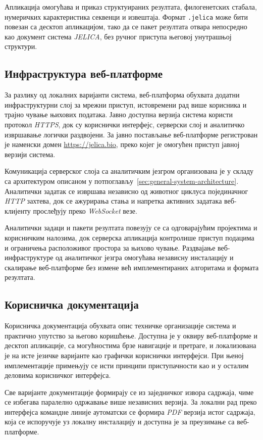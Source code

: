 \documentclass[12pt,oneside]{memoir}
\begin{document}
Апликација омогућава и приказ структуираних резултата, филогенетских стабала, нумеричких карактеристика секвенци и извештаја. Формат \texttt{.jelica} може бити повезан са десктоп апликацијом, тако да се пакет резултата отвара непосредно као документ система \textit{JELICA}, без ручног приступа његовој унутрашњој структури.


\subsection{Инфраструктура веб-платформе}
За разлику од локалних варијанти система, веб-платформа обухвата додатни инфраструктурни слој за мрежни приступ, истовремени рад више корисника и трајно чување њихових података. Јавно доступна верзија система користи протокол \textit{HTTPS}, док су кориснички интерфејс, серверски слој и аналитичко извршавање логички раздвојени. За јавно постављање веб-платформе регистрован је наменски домен \url{https://jelica.bio}, преко којег је омогућен приступ јавној верзији система.

Комуникација серверског слоја са аналитичким језгром организована је у складу са архитектуром описаном у потпоглављу~\ref{sec:general-system-architecture}. Аналитички задатак се извршава независно од животног циклуса појединачног \textit{HTTP} захтева, док се ажурирања стања и напретка активних задатака веб-клијенту прослеђују преко \textit{WebSocket} везе.

Аналитички задаци и пакети резултата повезују се са одговарајућим пројектима и корисничким налозима, док серверска апликација контролише приступ подацима и ограничења расположивог простора за њихово чување. Раздвајање веб-инфраструктуре од аналитичког језгра омогућава независну инсталацију и скалирање веб-платформе без измене већ имплементираних алгоритама и формата резултата.


\subsection{Корисничка документација}
Корисничка документација обухвата опис техничке организације система и практично упутство за његово коришћење. Доступна је у оквиру веб-платформе и десктоп апликације, са могућностима брзе навигације и претраге, и локализована је на исте језичке варијанте као графички кориснички интерфејси. При њеној имплементације примењују се исти принципи приступачности као и у осталим деловима корисничког интерфејса.

Све варијанте документације формирају се из заједничког извора садржаја, чиме се избегава паралелно одржавање више независних верзија. За локални рад преко интерфејса командне линије аутоматски се формира \textit{PDF} верзија истог садржаја, која се испоручује уз локалну инсталацију и доступна је за преузимање са веб-платформе.
\end{document}
